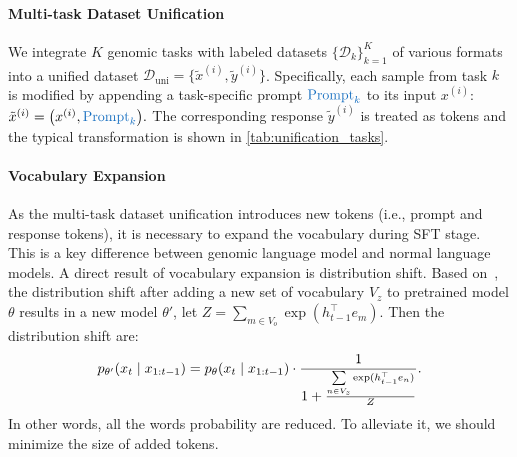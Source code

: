 \paragraph{Multi-task Dataset Unification}  
We integrate \( K \) genomic tasks with labeled datasets \(\{\mathcal{D}_k\}_{k=1}^K\) of various formats into a unified dataset $\mathcal{D}_{\text{uni}} = \{\tilde{x}^{(i)},\tilde{y}^{(i)}\}$. Specifically, each sample from task $k$ is modified by appending a task-specific prompt \(\textcolor{cyan!50!blue}{\text{Prompt}_k}\) to its input \(x^{(i)}\):
$
\tilde{x}^{(i)} = \big(x^{(i)}, \textcolor{cyan!50!blue}{\text{Prompt}_k}\big).
$
The corresponding response \(\tilde{y}^{(i)}\) is treated as tokens and the typical transformation is shown in \cref{tab:unification_tasks}.





\paragraph{Vocabulary Expansion} As the multi-task dataset unification introduces new tokens (i.e., prompt and response tokens), it is necessary to expand the vocabulary during SFT stage. This is a key difference between genomic language model and normal language models. A direct result of vocabulary expansion is distribution shift. Based on~\cite{hewitt2021initializing}, the distribution shift after adding a new set of vocabulary  $V_{z}$ to pretrained model $\theta$ results in a new model $\theta'$, let $\scriptstyle Z = \sum\limits_{m \in V_{o}} \exp(h_{t-1}^\top e_m)$. Then the distribution shift are:
\begin{equation} \small
    p_{\theta'}(x_t \mid x_{1:t-1}) = p_\theta(x_t \mid x_{1:t-1}) \cdot \frac{1}{1 + \frac{\sum\limits_{n \in V_{z}} \exp(h_{t-1}^\top e_n)}{Z}}.
    \label{eq:5}
\end{equation}
 In other words, all the words probability are reduced. To alleviate it, we should minimize the size of added tokens. 

